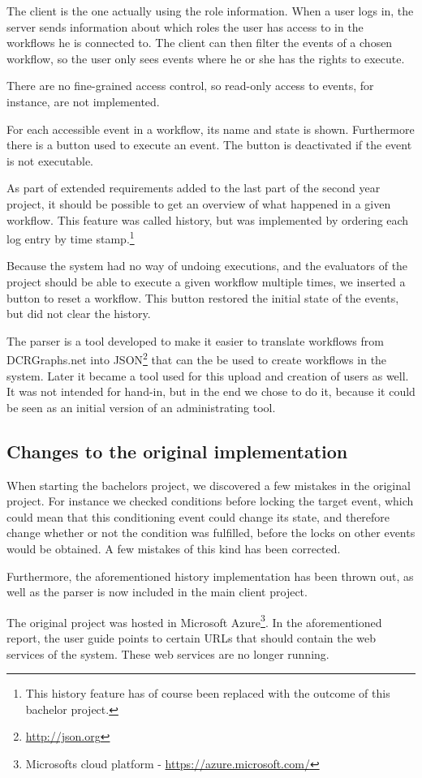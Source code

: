 		\newpar The client is the one actually using the role information. When a user logs in, the server sends information about which roles the user has access to in the workflows he is connected to. The client can then filter the events of a chosen workflow, so the user only sees events where he or she has the rights to execute.
		
		There are no fine-grained access control, so read-only access to events, for instance, are not implemented.
		
		\newpar For each accessible event in a workflow, its name and state is shown. Furthermore there is a button used to execute an event. The button is deactivated if the event is not executable.
		
		\newpar As part of extended requirements added to the last part of the second year project, it should be possible to get an overview of what happened in a given workflow. This feature was called history, but was implemented by ordering each log entry by time stamp.\footnote{This history feature has of course been replaced with the outcome of this bachelor project.}
		
		\newpar Because the system had no way of undoing executions, and the evaluators of the project should be able to execute a given workflow multiple times, we inserted a button to reset a workflow. This button restored the initial state of the events, but did not clear the history.
		
		\newpar The parser is a tool developed to make it easier to translate workflows from DCRGraphs.net into JSON\footnote{\url{http://json.org}} that can the be used to create workflows in the system. Later it became a tool used for this upload and creation of users as well. It was not intended for hand-in, but in the end we chose to do it, because it could be seen as an initial version of an administrating tool.
		
		\subsection{Changes to the original implementation}
			When starting the bachelors project, we discovered a few mistakes in the original project. For instance we checked conditions before locking the target event, which could mean that this conditioning event could change its state, and therefore change whether or not the condition was fulfilled, before the locks on other events would be obtained. A few mistakes of this kind has been corrected.
			
			\newpar Furthermore, the aforementioned history implementation has been thrown out, as well as the parser is now included in the main client project.

			\newpar The original project was hosted in Microsoft Azure\footnote{Microsofts cloud platform - \url{https://azure.microsoft.com/}}. In the aforementioned report, the user guide points to certain URLs that should contain the web services of the system. These web services are no longer running.